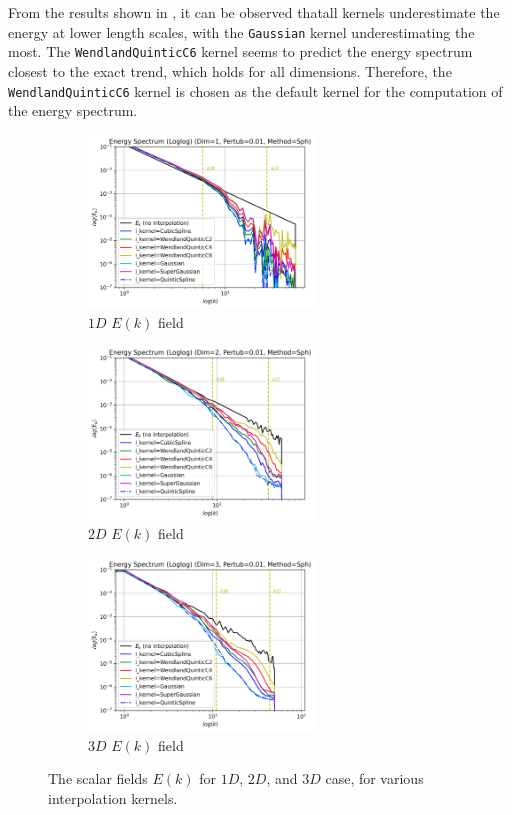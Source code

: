 From the results shown in , it can be observed thatall kernels underestimate the energy at lower length scales, with the \texttt{Gaussian} kernel underestimating the most.
The \texttt{WendlandQuinticC6} kernel seems to predict the energy spectrum closest to the exact trend, which holds for all dimensions.
Therefore, the \texttt{WendlandQuinticC6} kernel is chosen as the default kernel for the computation of the energy spectrum.

\begin{figure}[htbp!]
	\begin{subfigure}{7cm}
		\centering\includegraphics[width=6cm]{Code-Figures/sin-vel-prof-i-kernel/Energy Spectrum (Loglog) (Dim=1, Pertub=0.01, Method=Sph).png}
		\caption{$1D$ $E(k)$ field}
	\end{subfigure}
	\begin{subfigure}{7cm}
		\centering\includegraphics[width=6cm]{Code-Figures/sin-vel-prof-i-kernel/Energy Spectrum (Loglog) (Dim=2, Pertub=0.01, Method=Sph).png}
		\caption{$2D$ $E(k)$ field}
	\end{subfigure}
	\begin{subfigure}{7cm}
		\centering\includegraphics[width=6cm]{Code-Figures/sin-vel-prof-i-kernel/Energy Spectrum (Loglog) (Dim=3, Pertub=0.01, Method=Sph).png}
		\caption{$3D$ $E(k)$ field}
	\end{subfigure}
	\caption{The scalar fields $E(k)$ for $1D$, $2D$, and $3D$ case, for various interpolation kernels.}
	\label{fig:espec-scalar-fields-i-kernels}
\end{figure}

